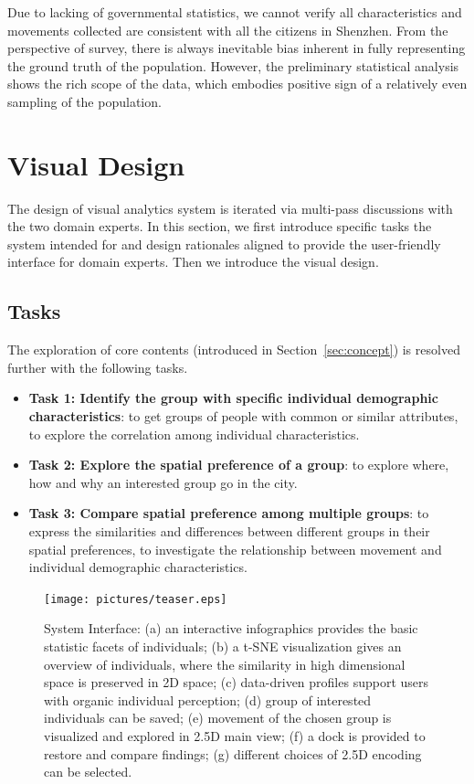 \documentclass{ieeeaccess}
\begin{document}
Due to lacking of governmental statistics, we cannot verify all characteristics and movements collected are consistent with all the citizens in Shenzhen. From the perspective of survey, there is always inevitable bias inherent in fully representing the ground truth of the population. However, the preliminary statistical analysis shows the rich scope of the data, which embodies positive sign of a relatively even sampling of the population.


\section{Visual Design}

The design of visual analytics system is iterated via multi-pass discussions with the two domain experts. In this section, we first introduce specific tasks the system intended for and design rationales aligned to provide the user-friendly interface for domain experts. Then we introduce the visual design.

\subsection{Tasks}

The exploration of core contents (introduced in Section~\ref{sec:concept}) is resolved further with the following tasks.

\begin{itemize}
\item \textbf{Task 1: Identify the group with specific individual demographic characteristics}: to get groups of people with common or similar attributes, to explore the correlation among individual characteristics.
\item \textbf{Task 2: Explore the spatial preference of a group}: to explore where, how and why an interested group go in the city.
\item \textbf{Task 3: Compare spatial preference among multiple groups}: to express the similarities and differences between different groups in their spatial preferences, to investigate the relationship between movement and individual demographic characteristics.
\end{itemize}

\begin{figure}[htb!]
 \centering %
 \texttt{[image: pictures/teaser.eps]}
 \caption{System Interface: (a) an interactive infographics provides the basic statistic facets of individuals; (b) a t-SNE visualization gives an overview of individuals, where the similarity in high dimensional space is preserved in 2D space; (c) data-driven profiles support users with organic individual perception; (d) group of interested individuals can be saved; (e) movement of the chosen group is visualized and explored in 2.5D main view; (f) a dock is provided to restore and compare findings; (g) different choices of 2.5D encoding can be selected.}
 \label{fig:teaser}
\end{figure}
\end{document}
